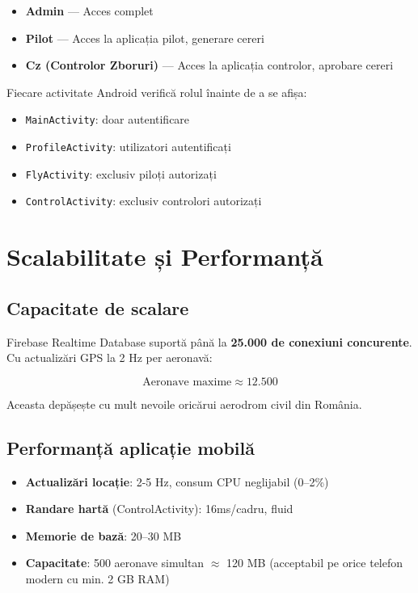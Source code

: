 \documentclass[11pt,a4paper]{report}
\begin{document}
\begin{itemize}
    \item \textbf{Admin} — Acces complet
    \item \textbf{Pilot} — Acces la aplicația pilot, generare cereri
    \item \textbf{Cz (Controlor Zboruri)} — Acces la aplicația controlor, aprobare cereri
\end{itemize}

Fiecare activitate Android verifică rolul înainte de a se afișa:

\begin{itemize}
    \item \texttt{MainActivity}: doar autentificare
    \item \texttt{ProfileActivity}: utilizatori autentificați
    \item \texttt{FlyActivity}: exclusiv piloți autorizați
    \item \texttt{ControlActivity}: exclusiv controlori autorizați
\end{itemize}

\chapter{Scalabilitate și Performanță}

\section{Capacitate de scalare}

Firebase Realtime Database suportă până la \textbf{25.000 de conexiuni concurente}.
Cu actualizări GPS la 2 Hz per aeronavă:

\[
\text{Aeronave maxime} \approx 12.500
\]

Aceasta depășește cu mult nevoile oricărui aerodrom civil din România.

\section{Performanță aplicație mobilă}

\begin{itemize}
    \item \textbf{Actualizări locație}: 2-5 Hz, consum CPU neglijabil (0–2\%)
    \item \textbf{Randare hartă} (ControlActivity): 16ms/cadru, fluid
    \item \textbf{Memorie de bază}: 20–30 MB
    \item \textbf{Capacitate}: 500 aeronave simultan $\approx$ 120 MB (acceptabil pe
    orice telefon modern cu min. 2 GB RAM)
\end{itemize}
\end{document}
